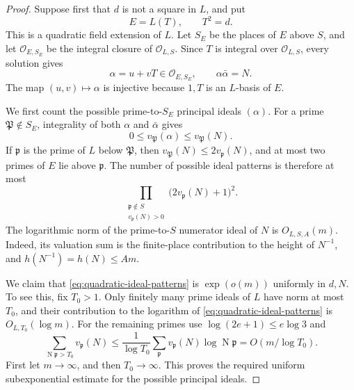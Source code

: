 \documentclass[11pt,reqno]{amsart}
\theoremstyle{definition}
\theoremstyle{remark}
\newcommand{\cO}{\mathcal O}
\newcommand{\Norm}{\operatorname{N}}
\begin{document}
\begin{proof}
Suppose first that \(d\) is not a square in \(L\), and put
\[
 E=L(T),\qquad T^2=d.
\]
This is a quadratic field extension of \(L\).  Let \(S_E\) be the places
of \(E\) above \(S\), and let \(\cO_{E,S_E}\) be the integral closure of
\(\cO_{L,S}\).  Since \(T\) is integral over \(\cO_{L,S}\), every solution
gives
\[
 \alpha=u+vT\in\cO_{E,S_E},\qquad
 \alpha\bar\alpha=N.
\]
The map \((u,v)\mapsto\alpha\) is injective because \(1,T\) is an
\(L\)-basis of \(E\).

We first count the possible prime-to-\(S_E\) principal ideals
\((\alpha)\).  For a prime \(\mathfrak P\notin S_E\), integrality of both
\(\alpha\) and \(\bar\alpha\) gives
\[
 0\le v_{\mathfrak P}(\alpha)
 \le v_{\mathfrak P}(N).
\]
If \(\mathfrak p\) is the prime of \(L\) below \(\mathfrak P\), then
\(v_{\mathfrak P}(N)\le2v_{\mathfrak p}(N)\), and at most two primes of
\(E\) lie above \(\mathfrak p\).  The number of possible ideal patterns is
therefore at most
\begin{equation}\label{eq:quadratic-ideal-patterns}
 \prod_{\substack{\mathfrak p\notin S\\
                   v_{\mathfrak p}(N)>0}}
       \bigl(2v_{\mathfrak p}(N)+1\bigr)^2.
\end{equation}
The logarithmic norm of the prime-to-\(S\) numerator ideal of \(N\) is
\(O_{L,S,A}(m)\).  Indeed, its valuation sum is the finite-place
contribution to the height of \(N^{-1}\), and
\(h(N^{-1})=h(N)\le Am\).

We claim that \eqref{eq:quadratic-ideal-patterns} is
\(\exp(o(m))\) uniformly in \(d,N\).  To see this, fix \(T_0>1\).  Only
finitely many prime ideals of \(L\) have norm at most \(T_0\), and their
contribution to
the logarithm of \eqref{eq:quadratic-ideal-patterns} is
\(O_{L,T_0}(\log m)\).  For the remaining primes use
\(\log(2e+1)\le e\log3\) and
\[
 \sum_{\Norm\mathfrak p>T_0}v_{\mathfrak p}(N)
 \le\frac1{\log T_0}
     \sum_{\mathfrak p}v_{\mathfrak p}(N)
                           \log\Norm\mathfrak p
 =O(m/\log T_0).
\]
First let \(m\to\infty\), and then \(T_0\to\infty\).  This proves the
required uniform subexponential estimate for the possible principal ideals.


\end{proof}
\end{document}
